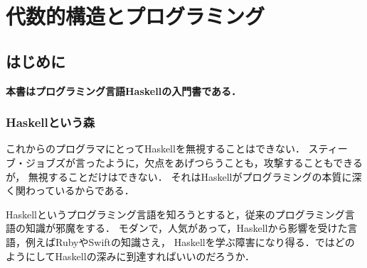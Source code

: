 \documentclass[a5paper,draft]{jsbook}
\newcommand{\programminglanguage}[1]{\textsf{#1}}
\newcommand{\haskell}{\programminglanguage{Haskell}}
\newcommand{\python}{\programminglanguage{Python}}
\newcommand{\ruby}{\programminglanguage{Ruby}}
\newcommand{\swift}{\programminglanguage{Swift}}
\newenvironment{leader}{\begingroup\bf}{\endgroup}
\newcommand{\pthnId}[1]{\textit{#1}}
\newcommand{\pthnKeyword}[1]{\textbf{#1}}
\newcommand{\pthnOp}[1]{\texttt{#1}}
\newcommand{\pthnString}[1]{\texttt{#1}}
\begin{document}

\part{代数的構造とプログラミング}

\chapter{はじめに}

\begin{leader}
本書はプログラミング言語\haskell の入門書である．
\end{leader}

\section{\haskell という森}

これからのプログラマにとって\haskell を無視することはできない．
スティーブ・ジョブズが言ったように，欠点をあげつらうことも，攻撃することもできるが，
無視することだけはできない．
それは\haskell がプログラミングの本質に深く関わっているからである．

\haskell というプログラミング言語を知ろうとすると，従来のプログラミング言語の知識が邪魔をする．
モダンで，人気があって，\haskell から影響を受けた言語，例えば\ruby や\swift の知識さえ，
\haskell を学ぶ障害になり得る．ではどのようにして\haskell の深みに到達すればいいのだろうか．
\end{document}
